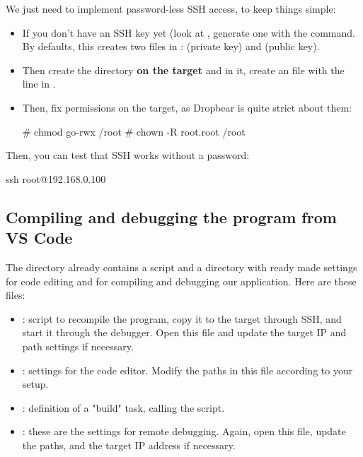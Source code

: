 We just need to implement password-less SSH access, to keep things
simple:

\begin{itemize}
  \item If you don't have an SSH key yet (look at ,
	generate one with the  command.
	By defaults, this creates two files in :
	 (private key) and  (public key).
  \item Then create the  directory {\bf on the target}
        and in it, create an  file with the line in
        .
  \item Then, fix permissions on the target, as Dropbear is quite strict
        about them:
        \begin{bashinput}
# chmod go-rwx /root
# chown -R root.root /root
        \end{bashinput}
\end{itemize}

Then, you can test that SSH works without a password:

\begin{bashinput}
ssh root@192.168.0.100
\end{bashinput}

\subsection{Compiling and debugging the program from VS Code}

The  directory already contains a 
script and a  directory with ready made settings for
code editing and for compiling and debugging our application.
Here are these files:

\begin{itemize}
   \item {}: script to recompile the program,
         copy it to the target through SSH, and start it through the debugger.
         Open this file and update the target IP and path settings if
         necessary.
   \item {}: settings for the code editor.
         Modify the paths in this file according to your setup.
   \item {}: definition of a "build" task,
         calling the  script.
   \item {}: these are the settings for remote
         debugging. Again, open this file, update the paths, and the
	 target IP address if necessary.
\end{itemize}

